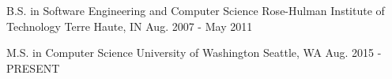 

\begin{cventries}

  \cventry
    {B.S. in Software Engineering and Computer Science} %
    {Rose-Hulman Institute of Technology} %
    {Terre Haute, IN} %
    {Aug. 2007 - May 2011} %
    {
    }
  \vspace{-5mm}

  \cventry
    {M.S. in Computer Science} %
    {University of Washington} %
    {Seattle, WA} %
    {Aug. 2015 - PRESENT} %
    {
    }
  \vspace{-5mm}
\end{cventries}
